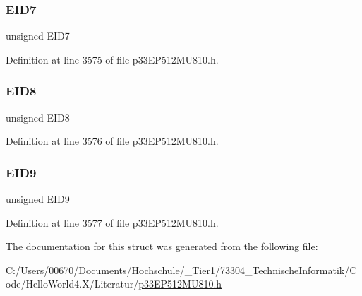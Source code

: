 \subsubsection{\texorpdfstring{E\+I\+D7}{EID7}}
{\footnotesize\ttfamily unsigned E\+I\+D7}



Definition at line 3575 of file p33\+E\+P512\+M\+U810.\+h.

\mbox{\label{structtag_c1_r_x_m1_e_i_d_b_i_t_s_acca25e0b7d86eb499d01f85222baea87}} 
\subsubsection{\texorpdfstring{E\+I\+D8}{EID8}}
{\footnotesize\ttfamily unsigned E\+I\+D8}



Definition at line 3576 of file p33\+E\+P512\+M\+U810.\+h.

\mbox{\label{structtag_c1_r_x_m1_e_i_d_b_i_t_s_ac6748f73d4ada8538b06548be4f396c2}} 
\subsubsection{\texorpdfstring{E\+I\+D9}{EID9}}
{\footnotesize\ttfamily unsigned E\+I\+D9}



Definition at line 3577 of file p33\+E\+P512\+M\+U810.\+h.



The documentation for this struct was generated from the following file\+:\begin{DoxyCompactItemize}
\item 
C\+:/\+Users/00670/\+Documents/\+Hochschule/\+\_\+\+Tier1/73304\+\_\+\+Technische\+Informatik/\+Code/\+Hello\+World4.\+X/\+Literatur/\hyperlink{p33_e_p512_m_u810_8h}{p33\+E\+P512\+M\+U810.\+h}\end{DoxyCompactItemize}
